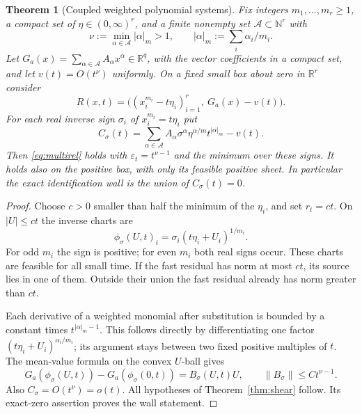 \documentclass[11pt,reqno]{amsart}
\numberwithin{equation}{section}
\newtheorem{theorem}{Theorem}[section]
\theoremstyle{definition}
\theoremstyle{remark}
\newcommand{\R}{\mathbb R}
\newcommand{\eps}{\varepsilon}
\begin{document}
\begin{theorem}[Coupled weighted polynomial systems]\label{thm:weighted}
Fix integers $m_1,\ldots,m_r\ge1$, a compact set of $\eta\in(0,\infty)^r$, and a finite nonempty set $\mathcal A\subset\mathbb N^r$ with
\[
 \nu:=\min_{\alpha\in\mathcal A}|\alpha|_m>1,
 \qquad |\alpha|_m:=\sum_i\alpha_i/m_i.
\]
Let $G_a(x)=\sum_{\alpha\in\mathcal A}A_\alpha x^\alpha\in\R^q$, with the vector coefficients in a compact set, and let $v(t)=O(t^\nu)$ uniformly. On a fixed small box about zero in $\R^r$ consider
\begin{equation}\label{eq:weighted-residual}
 R(x,t)=\bigl((x_i^{m_i}-t\eta_i)_{i=1}^r,\ G_a(x)-v(t)\bigr).
\end{equation}
For each real inverse sign $\sigma_i$ of $x_i^{m_i}=t\eta_i$ put
\begin{equation}\label{eq:Cweighted}
 C_\sigma(t)=\sum_{\alpha\in\mathcal A}
 A_\alpha\sigma^\alpha\eta^{\alpha/m}t^{|\alpha|_m}-v(t).
\end{equation}
Then \eqref{eq:multirel} holds with $\eps_t=t^{\nu-1}$ and the minimum over these signs. It holds also on the positive box, with only its feasible positive sheet. In particular the exact identification wall is the union of $C_\sigma(t)=0$.
\end{theorem}
\begin{proof}
Choose $c>0$ smaller than half the minimum of the $\eta_i$, and set $r_t=ct$. On $|U|\le ct$ the inverse charts are
\[
 \phi_\sigma(U,t)_i=\sigma_i(t\eta_i+U_i)^{1/m_i}.
\]
For odd $m_i$ the sign is positive; for even $m_i$ both real signs occur. These charts are feasible for all small time. If the fast residual has norm at most $ct$, its source lies in one of them. Outside their union the fast residual already has norm greater than $ct$.

Each derivative of a weighted monomial after substitution is bounded by a constant times $t^{|\alpha|_m-1}$. This follows directly by differentiating one factor $(t\eta_i+U_i)^{\alpha_i/m_i}$; its argument stays between two fixed positive multiples of $t$. The mean-value formula on the convex $U$-ball gives
\[
 G_a(\phi_\sigma(U,t))-G_a(\phi_\sigma(0,t))=B_\sigma(U,t)U,
 \qquad \|B_\sigma\|\le C t^{\nu-1}.
\]
Also $C_\sigma=O(t^\nu)=o(t)$. All hypotheses of Theorem~\ref{thm:shear} follow. Its exact-zero assertion proves the wall statement.
\end{proof}
\end{document}
